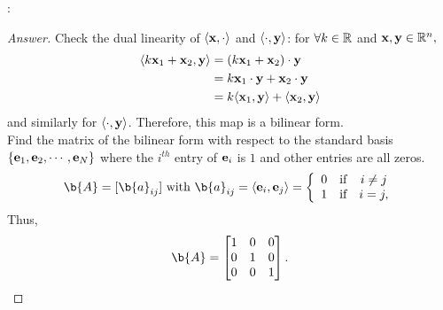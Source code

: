 \noindent {}:
\begin{proof}[Answer]
\label{answer:bf4}
Check the dual linearity of $\langle \mathbf{x}, \cdot \rangle$ and $\langle \cdot, \mathbf{y} \rangle$: for $\forall k \in \mathbb{R}$ and $\mathbf{x},\mathbf{y} \in \mathbb{R}^n,$
%
\begin{align*}
    \langle k\mathbf{x}_1 + \mathbf{x}_2, \mathbf{y} \rangle 
&= (k\mathbf{x}_1 + \mathbf{x}_2) \cdot \mathbf{y} \\
&= k\mathbf{x}_1 \cdot \mathbf{y} + \mathbf{x}_2 \cdot \mathbf{y} \\
&= k \langle \mathbf{x}_1, \mathbf{y} \rangle + \langle \mathbf{x}_2, \mathbf{y} \rangle
\end{align*}
%
and similarly for $\langle \cdot, \mathbf{y} \rangle$.
Therefore, this map is a bilinear form.\\

\noindent Find the matrix of the bilinear form with respect to the standard basis $\{\mathbf{e}_1, \mathbf{e}_2, \cdots, \mathbf{e}_N \}$ where the $i^{th}$ entry of $\mathbf{e}_i$ is $1$ and other entries are all zeros.
%
\begin{equation*}
    \b{A} = [\b{a}_{ij}] \textnormal{  with  } \b{a}_{ij} 
    = \langle \e_i, \e_j \rangle
    =\left\{ 
    \begin{array}{ccc}
    0 &  \mbox{if}  & i \neq j  \\
    1 &  \mbox{if}  & i=j,
    \end{array}
    \right.
\end{equation*}
%
Thus,
$$\b{A}=
    \begin{bmatrix}
        1   &0  &0\\
        0   &1  &0\\
        0   &0  &1
    \end{bmatrix}.
$$


\end{proof}
